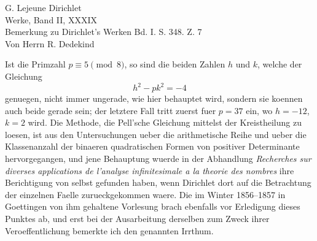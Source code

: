 \documentclass[11pt]{article}
\newcommand{\paperhead}[3]{\begin{center}{\Large G. Lejeune Dirichlet}\\[0.25em]{\large Werke, Band II, #1}\\[0.75em]{\LARGE #2}\\[0.35em]{\large #3}\end{center}\bigskip}
\begin{document}
\paperhead{XXXIX}{Bemerkung zu Dirichlet's Werken Bd. I. S. 348. Z. 7}{Von Herrn R. Dedekind}

Ist die Primzahl \(p\equiv 5\pmod 8\), so sind die beiden Zahlen \(h\) und \(k\), welche der Gleichung
\[
h^2-pk^2=-4
\]
genuegen, nicht immer ungerade, wie hier behauptet wird, sondern sie koennen auch beide gerade sein; der letztere Fall tritt zuerst fuer \(p=37\) ein, wo \(h=-12\), \(k=2\) wird. Die Methode, die Pell'sche Gleichung mittelst der Kreistheilung zu loesen, ist aus den Untersuchungen ueber die arithmetische Reihe und ueber die Klassenanzahl der binaeren quadratischen Formen von positiver Determinante hervorgegangen, und jene Behauptung wuerde in der Abhandlung \emph{Recherches sur diverses applications de l'analyse infinitesimale a la theorie des nombres} ihre Berichtigung von selbst gefunden haben, wenn Dirichlet dort auf die Betrachtung der einzelnen Faelle zurueckgekommen waere. Die im Winter 1856--1857 in Goettingen von ihm gehaltene Vorlesung brach ebenfalls vor Erledigung dieses Punktes ab, und erst bei der Ausarbeitung derselben zum Zweck ihrer Veroeffentlichung bemerkte ich den genannten Irrthum.
\end{document}

